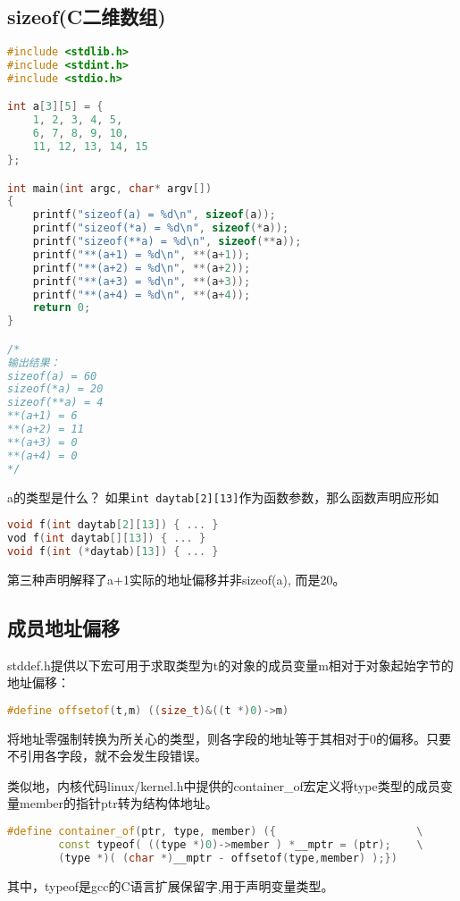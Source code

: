 \subsection{sizeof(C二维数组)}
\begin{lstlisting}[language=C++]
#include <stdlib.h>
#include <stdint.h>
#include <stdio.h>

int a[3][5] = {
    1, 2, 3, 4, 5, 
    6, 7, 8, 9, 10, 
    11, 12, 13, 14, 15
};

int main(int argc, char* argv[])
{
    printf("sizeof(a) = %d\n", sizeof(a));
    printf("sizeof(*a) = %d\n", sizeof(*a));
    printf("sizeof(**a) = %d\n", sizeof(**a));
    printf("**(a+1) = %d\n", **(a+1));
    printf("**(a+2) = %d\n", **(a+2));
    printf("**(a+3) = %d\n", **(a+3));
    printf("**(a+4) = %d\n", **(a+4));
    return 0;
}

/*
输出结果：
sizeof(a) = 60
sizeof(*a) = 20
sizeof(**a) = 4
**(a+1) = 6
**(a+2) = 11
**(a+3) = 0
**(a+4) = 0
*/                        
\end{lstlisting}

a的类型是什么？
如果\verb$int daytab[2][13]$作为函数参数，那么函数声明应形如
\begin{lstlisting}[language=C++]
void f(int daytab[2][13]) { ... }
vod f(int daytab[][13]) { ... }
void f(int (*daytab)[13]) { ... }          
\end{lstlisting}
第三种声明解释了a+1实际的地址偏移并非sizeof(a), 而是20。

\subsection{成员地址偏移}
stddef.h提供以下宏可用于求取类型为t的对象的成员变量m相对于对象起始字节的地址偏移\cite{pibible}：
\begin{lstlisting}[language=C++]
 #define offsetof(t,m) ((size_t)&((t *)0)->m)
\end{lstlisting}
将地址零强制转换为所关心的类型，则各字段的地址等于其相对于0的偏移。只要不引用各字段，就不会发生段错误。


类似地，内核代码linux/kernel.h中提供的container\_of宏定义将type类型的成员变量member的指针ptr转为结构体地址。
\begin{lstlisting}[language=C++]
  #define container_of(ptr, type, member) ({                      \
        const typeof( ((type *)0)->member ) *__mptr = (ptr);    \
        (type *)( (char *)__mptr - offsetof(type,member) );})
\end{lstlisting}
其中，typeof是gcc的C语言扩展保留字,用于声明变量类型。





